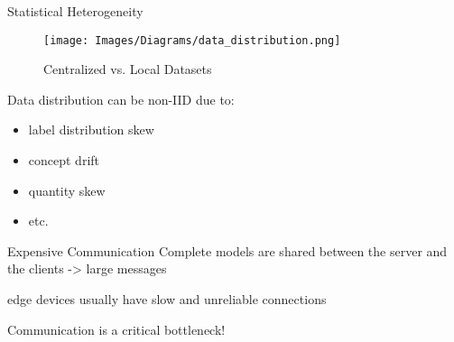 \begin{frame}{Statistical Heterogeneity}
	\begin{minipage}{0.45\textwidth}
        \begin{figure}[H]
            \centering
    		\texttt{[image: Images/Diagrams/data\_distribution.png]}\\
    		\caption*{Centralized vs. Local Datasets}
    	 \end{figure}
	\end{minipage}%
	\begin{minipage}{0.6\textwidth}
		\hspace{0.35cm}Data distribution can be non-IID due to:
		\begin{itemize}
		    \item label distribution skew
		    \item concept drift
		    \item quantity skew
		    \item etc.
		\end{itemize}
	\end{minipage}%
\end{frame}

\begin{frame}{Expensive Communication}
Complete models are shared between the server and the clients -> large messages

edge devices usually have slow and unreliable connections

Communication is a critical bottleneck!
\end{frame}
